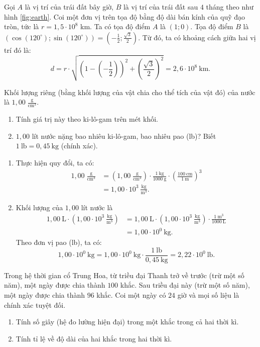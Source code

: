 \documentclass[a4paper, titlepage, openany]{book}
\newcounter{exercise}
\newcounter{solution}
\begin{document}
Gọi $A$ là vị trí của trái đất bây giờ, $B$ là vị trí của trái đất sau $4$ tháng theo như hình \ref{fig:earth}. Coi một đơn vị trên tọa độ bằng độ dài bán kính của quỹ đạo tròn, tức là $r=1{,}5\cdot10^8$ km. Ta có tọa độ điểm $A$ là $(1;0)$. Tọa độ điểm $B$ là $\left(\cos(120^{\circ}); \sin(120^{\circ})\right)=\left(-\frac{1}{2}; \frac{\sqrt{3}}{2}\right)$. Từ đó, ta có khoảng cách giữa hai vị trí đó là: $$d = r\cdot \sqrt{\left(1-\left(-\frac{1}{2}\right)\right)^2 + \left(\frac{\sqrt{3}}{2}\right)^2}=\boxed{2{,}6\cdot10^8\ \text{km}}.$$

\exercise Khối lượng riêng (bằng khối lượng của vật chia cho thể tích của vật đó) của nước là $1{,}00 \;\frac{\text{g}}{\text{cm}^3}$.
\begin{enumerate}
   \item Tính giá trị này theo ki-lô-gam trên mét khối.
   \item $1{,}00$ lít nước nặng bao nhiêu ki-lô-gam, bao nhiêu pao (lb)? Biết $1\ \text{lb} = 0{,}45\ \text{kg}$ (chính xác).
\end{enumerate}

\solution
\begin{enumerate}
   \item Thực hiện quy đổi, ta có:
   \begin{align*}
      1{,}00\;\frac{\text{g}}{\text{cm}^3} &= \left(1{,}00\;\frac{\text{g}}{\text{cm}^3}\right)\cdot\frac{1\ \text{kg}}{1000\ \text{g}}\cdot\left(\frac{100\ \text{cm}}{1\ \text{m}}\right)^3 \\
      &= \boxed{1{,}00\cdot 10^3\ \frac{\text{kg}}{\text{m}^3}}.
   \end{align*}
   \item Khối lượng của $1{,}00$ lít nước là
   \begin{align*}
      1{,}00\ \text{L} \cdot \left(1{,}00\cdot 10^3\ \frac{\text{kg}}{\text{m}^3}\right)&= 1{,}00\ \text{L} \cdot \left(1{,}00\cdot 10^3\ \frac{\text{kg}}{\text{m}^3}\right) \cdot \frac{1\ \text{m}^3}{1000\ \text{L}} \\
      &= \boxed{1{,}00\cdot 10^0\ \text{kg}}.
   \end{align*}
   Theo đơn vị pao (lb), ta có:
   \[
      1{,}00\cdot 10^0\ \text{kg} = 1{,}00\cdot 10^0\ \text{kg} \cdot \frac{1\ \text{lb}}{0{,}45\ \text{kg}} = \boxed{2{,}22\cdot 10^0\ \text{lb}}.
   \]
\end{enumerate}

\exercise Trong hệ thời gian cổ Trung Hoa, từ triều đại Thanh trở về trước (trừ một số năm), một ngày được chia thành $100$ khắc. Sau triều đại này (trừ một số năm), một ngày được chia thành $96$ khắc. Coi một ngày có $24$ giờ và mọi số liệu là chính xác tuyệt đối.
\begin{enumerate}
   \item Tính số giây (hệ đo lường hiện đại) trong một khắc trong cả hai thời kì.
   \item Tính tỉ lệ về độ dài của hai khắc trong hai thời kì.
\end{enumerate}
\end{document}
